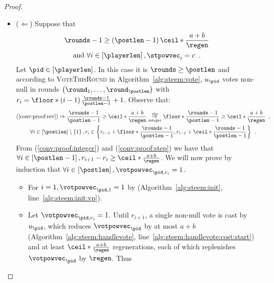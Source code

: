 \begin{proof}
  \begin{itemize}
    \item ($\Leftarrow$) Suppose that
    \begin{gather}
      \label{conv:proof:rev}
      \rounds - 1 \geq \left(\postlen - 1\right)\ceil*{\frac{a+b}{\regen}} \\
      \text{and } \forall i \in \left[\playerlen\right], \stpowvec_i = c
      \enspace. \nonumber
    \end{gather}
    Let $\pid \in \left[\playerlen\right]$. In this case it is $\rounds \geq
    \postlen$ and according to \textsc{VoteThisRound} in
    Algorithm~\ref{alg:steem:vote}, $u_{\pid}$ votes non-null in rounds
    $\left(\round_1, \dots, \round_\postlen\right)$ with $r_i = \floor*{\left(i
    - 1\right)\frac{\rounds - 1}{\postlen - 1}} + 1$. Observe that:
    \begin{gather}
      \label{conv:proof:integer}
      \left(\ref{conv:proof:rev}\right) \Rightarrow \frac{\rounds - 1}{\postlen
      - 1} \geq \ceil*{\frac{a+b}{\regen}}
      \underset{\text{integer}}{\overset{\text{rhs}}{\Rightarrow}}
      \floor*{\frac{\rounds - 1}{\postlen - 1}} \geq \ceil*{\frac{a+b}{\regen}}
      \enspace, \\
      \label{conv:proof:step}
      \forall i \in \left[\postlen\right] \setminus \left\{1\right\}, r_i
      \in \left\{r_{i - 1} + \floor*{\frac{\rounds - 1}{\postlen - 1}}, r_{i -
      1} + \ceil*{\frac{\rounds - 1}{\postlen - 1}}\right\} \enspace.
    \end{gather}
    From (\ref{conv:proof:integer}) and (\ref{conv:proof:step}) we have that
    $\forall i \in \left[\postlen - 1\right], r_{i+1} - r_i \geq
    \ceil*{\frac{a+b}{\regen}}$. We will now prove by induction that $\forall i
    \in \left[\postlen\right], \votpowvec_{\pid, r_i} = 1$.
    \begin{itemize}
      \item For $i = 1, \votpowvec_{\pid, 1} = 1$ by
      (Algorithm~\ref{alg:steem:init}, line~\ref{alg:steem:init:vp}).  \item Let
      $\votpowvec_{\pid, r_i} = 1$. Until $r_{i + 1}$, a single non-null vote is
      cast by $u_\pid$, which reduces $\votpowvec_{\pid}$ by at most $a + b$
      (Algorithm~\ref{alg:steem:handlevote},
      line~\ref{alg:steem:handlevote:cost:start}) and at least $\ceil*{\frac{a +
      b}{\regen}}$ regenerations, each of which replenishes $\votpowvec_{\pid}$
      by $\regen$. Thus
      \begin{equation*}

\end{equation*}
\end{itemize}
\end{itemize}
\end{proof}
